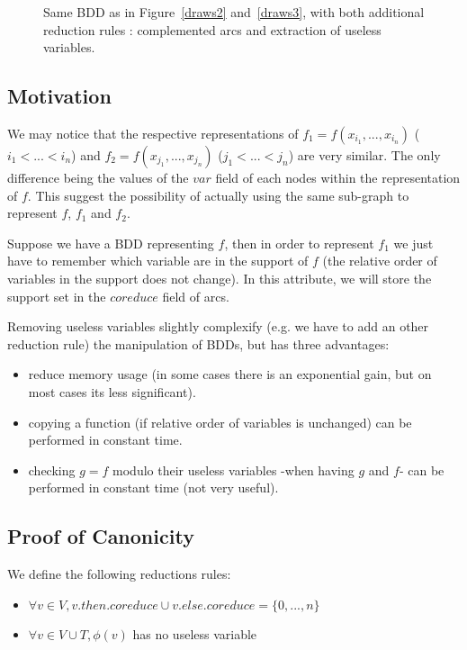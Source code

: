 \documentclass[a4paper,10pt]{article}
\newcommand{\includeframe}[4]{\makebox[#2\linewidth]{\texttt{[image: \#4]}}}
\begin{document}
\begin{figure}
\centering
\includeframe{4}{1}{}{draws.pdf}
\caption{Same BDD as in Figure~\ref{draws2} and~\ref{draws3}, with both additional reduction rules : complemented arcs and extraction of useless variables.}
\label{draws4}
\end{figure}

\subsection{Motivation}
We may notice that the respective representations of $f_1 = f(x_{i_1}, ..., x_{i_n})$ ($i_1 < ... < i_n$) and $f_2 = f(x_{j_1}, ..., x_{j_n})$ ($j_1 < ... < j_n$) are very similar.
The only difference being the values of the $var$ field of each nodes within the representation of $f$.
This suggest the possibility of actually using the same sub-graph to represent $f$, $f_1$ and $f_2$.


Suppose we have a BDD representing $f$, then in order to represent $f_1$ we just have to remember which variable are in the support of $f$ (the relative order of variables in the support does not change).
In this attribute, we will store the support set in the $coreduce$ field of arcs.

Removing useless variables slightly complexify (e.g. we have to add an other reduction rule) the manipulation of BDDs, but has three advantages:\begin{itemize}
\item reduce memory usage (in some cases there is an exponential gain, but on most cases its less significant).
\item copying a function (if relative order of variables is unchanged) can be performed in constant time.
\item checking $g = f$ modulo their useless variables -when having $g$ and $f$- can be performed in constant time (not very useful).
\end{itemize}

\subsection{Proof of Canonicity}

We define the following reductions rules:\begin{itemize}
  \item $\forall v\in V, v.then.coreduce \cup v.else.coreduce = \{0, ..., n\}$
  \item $\forall v\in V\cup T, \phi(v)$ has no useless variable
\end{itemize}
\end{document}
